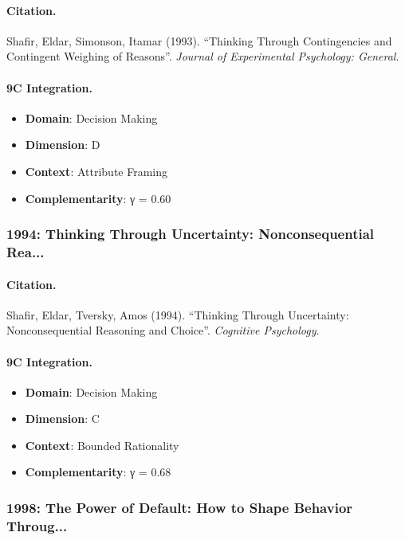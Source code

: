 \paragraph{Citation.}
Shafir, Eldar, Simonson, Itamar (1993). ``Thinking Through Contingencies and Contingent Weighing of Reasons''. \textit{Journal of Experimental Psychology: General}.

\paragraph{9C Integration.}
\begin{itemize}[nosep]
  \item \textbf{Domain}: Decision Making
  \item \textbf{Dimension}: D
  \item \textbf{Context}: Attribute Framing
  \item \textbf{Complementarity}: γ = 0.60
\end{itemize}


\subsubsection{1994: Thinking Through Uncertainty: Nonconsequential Rea...}

\paragraph{Citation.}
Shafir, Eldar, Tversky, Amos (1994). ``Thinking Through Uncertainty: Nonconsequential Reasoning and Choice''. \textit{Cognitive Psychology}.

\paragraph{9C Integration.}
\begin{itemize}[nosep]
  \item \textbf{Domain}: Decision Making
  \item \textbf{Dimension}: C
  \item \textbf{Context}: Bounded Rationality
  \item \textbf{Complementarity}: γ = 0.68
\end{itemize}


\subsubsection{1998: The Power of Default: How to Shape Behavior Throug...}

